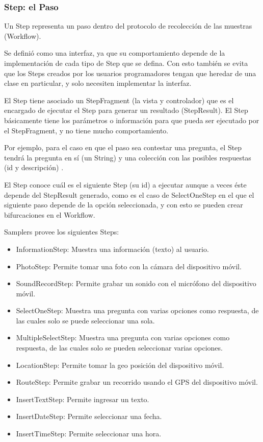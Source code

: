 \subsubsection{Step: el Paso}
Un Step representa un paso dentro del protocolo de recolección de las muestras (Workflow).

Se definió como una interfaz, ya que su comportamiento depende de la implementación de cada tipo de Step que se defina. Con esto también se evita que los Steps creados por los usuarios programadores tengan que heredar de una clase en particular, y solo necesiten implementar la interfaz.

El Step tiene asociado un StepFragment (la vista y controlador) que es el encargado de ejecutar el Step para generar un resultado (StepResult). El Step básicamente tiene los parámetros o información para que pueda ser ejecutado por el StepFragment, y no tiene mucho comportamiento.

Por ejemplo, para el caso en que el paso sea contestar una pregunta, el Step tendrá la pregunta en sí (un String) y una colección con las posibles respuestas (id y descripción) .

El Step conoce cuál es el siguiente Step (su id) a ejecutar aunque a veces éste depende del StepResult generado, como es el caso de SelectOneStep en el que el siguiente paso depende de la opción seleccionada, y con esto se pueden crear bifurcaciones en el Workflow.

Samplers provee los siguientes Steps:
\begin{itemize}
	\item InformationStep: Muestra una información (texto) al usuario.
	\item PhotoStep: Permite tomar una foto con la cámara del dispositivo móvil.
	\item SoundRecordStep: Permite grabar un sonido con el micrófono del dispositivo móvil.
	\item SelectOneStep: Muestra una pregunta con varias opciones como respuesta, de las cuales solo se puede seleccionar una sola.
	\item MultipleSelectStep: Muestra una pregunta con varias opciones como respuesta, de las cuales solo se pueden seleccionar varias opciones.
	\item LocationStep: Permite tomar la geo posición del dispositivo móvil.
	\item RouteStep: Permite grabar un recorrido usando el GPS del dispositivo móvil.
	\item InsertTextStep: Permite ingresar un texto.
	\item InsertDateStep: Permite seleccionar una fecha.
	\item InsertTimeStep: Permite seleccionar una hora.
\end{itemize}

